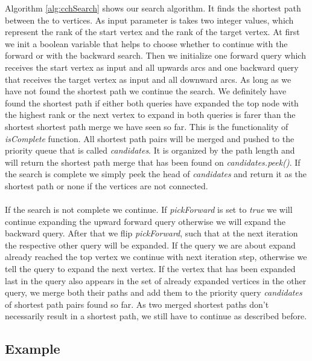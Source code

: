 Algorithm \ref{alg:cchSearch} shows our search algorithm. It finds the shortest path between the to vertices. As input parameter is takes two integer values, which represent the rank of the start vertex and the rank of the target vertex.
At first we init a boolean variable that helps to choose whether to continue with the forward or with the backward search. Then we initialize one forward query which receives the start vertex as input and all upwards arcs and one backward query that receives 
the target vertex as input and all downward arcs. As long as we have not found the shortest path we continue the search. We definitely have found the shortest path if either both queries have expanded the top node with the highest rank or 
the next vertex to expand in both queries is farer than the shortest shortest path merge we have seen so far. This is the functionality of \textit{isComplete} function. All shortest path pairs will be merged and pushed to the priority queue that is called \textit{candidates}.
It is organized by the path length and will return the shortest path merge that has been found on \textit{candidates.peek()}.
If the search is complete we simply peek the head of \textit{candidates} and return it as the shortest path or none if the vertices are not connected.
\\\\
If the search is not complete we continue. If \textit{pickForward} is set to \textit{true} we will continue expanding the upward forward query otherwise we will expand the backward query. After that we flip \textit{pickForward}, such that at the next iteration the respective other query will be expanded.
If the query we are about expand already reached the top vertex we continue with next iteration step, otherwise we tell the query to expand the next vertex. If the vertex that has been expanded last in the query also appears in the set of already 
expanded vertices in the other query, we merge both their paths and add them to the priority query \textit{candidates} of shortest path pairs found so far. As two merged shortest paths don't necessarily result in a shortest path, we still have to continue as described before.

\subsection{Example}

